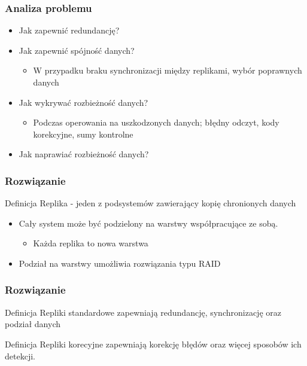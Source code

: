 \documentclass{beamer}
\begin{document}
	\begin{frame}
		\frametitle{Analiza problemu}

		\begin{itemize}
			\item Jak zapewnić redundancję?
			\pause
			\item Jak zapewnić spójność danych?
			\begin{itemize}
				\item W przypadku braku synchronizacji między replikami, wybór poprawnych danych
			\end{itemize}
			\pause
			\item Jak wykrywać rozbieżność danych?
			\begin{itemize}
				\item Podczas operowania na uszkodzonych danych; błędny odczyt, kody korekcyjne, sumy kontrolne 
			\end{itemize}
			\pause
			\item Jak naprawiać rozbieżność danych?
			
		\end{itemize}
	\end{frame}
		
	\begin{frame}
		\frametitle{Rozwiązanie}
			\begin{block}{Definicja}
				Replika - jeden z podsystemów zawierający kopię chronionych danych
			\end{block}
			\pause
			\begin{itemize}
				\item Cały system może być podzielony na warstwy współpracujące ze sobą. 
				\begin{itemize}
					\item Każda replika to nowa warstwa
				\end{itemize}
				\pause
				\item Podział na warstwy umożliwia rozwiązania typu RAID
			\end{itemize}
			
	\end{frame}

		
\begin{frame}
	\frametitle{Rozwiązanie}
	\begin{block}{Definicja}
            Repliki standardowe zapewniają redundancję, synchronizację oraz podział danych
	\end{block}
	\pause
	\begin{block}{Definicja}
	        Repliki korecyjne zapewniają korekcję błędów oraz więcej sposobów ich detekcji.
    \end{block}
\end{frame}
\end{document}

